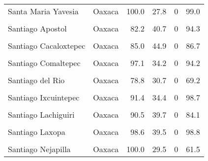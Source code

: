 \documentclass[
]{report}
\begin{document}
\begin{longtable}[t]{llrrrr}
Santa Maria Yavesia & Oaxaca & 100.0 & 27.8 & 0 & 99.0\\
\addlinespace
\cellcolor{gray!6}{Santiago Apoala} & \cellcolor{gray!6}{Oaxaca} & \cellcolor{gray!6}{90.8} & \cellcolor{gray!6}{27.6} & \cellcolor{gray!6}{0} & \cellcolor{gray!6}{94.3}\\
Santiago Apostol & Oaxaca & 82.2 & 40.7 & 0 & 94.3\\
\cellcolor{gray!6}{Santiago Atitlan} & \cellcolor{gray!6}{Oaxaca} & \cellcolor{gray!6}{82.4} & \cellcolor{gray!6}{38.1} & \cellcolor{gray!6}{0} & \cellcolor{gray!6}{98.9}\\
Santiago Cacaloxtepec & Oaxaca & 85.0 & 44.9 & 0 & 86.7\\
\cellcolor{gray!6}{Santiago Camotlan} & \cellcolor{gray!6}{Oaxaca} & \cellcolor{gray!6}{90.6} & \cellcolor{gray!6}{38.5} & \cellcolor{gray!6}{0} & \cellcolor{gray!6}{98.3}\\
\addlinespace
Santiago Comaltepec & Oaxaca & 97.1 & 34.2 & 0 & 94.2\\
\cellcolor{gray!6}{Santiago Choapam} & \cellcolor{gray!6}{Oaxaca} & \cellcolor{gray!6}{83.0} & \cellcolor{gray!6}{29.3} & \cellcolor{gray!6}{0} & \cellcolor{gray!6}{88.8}\\
Santiago del Rio & Oaxaca & 78.8 & 30.7 & 0 & 69.2\\
\cellcolor{gray!6}{Santiago Huauclilla} & \cellcolor{gray!6}{Oaxaca} & \cellcolor{gray!6}{95.8} & \cellcolor{gray!6}{28.5} & \cellcolor{gray!6}{0} & \cellcolor{gray!6}{81.0}\\
Santiago Ixcuintepec & Oaxaca & 91.4 & 34.4 & 0 & 98.7\\
\addlinespace
\cellcolor{gray!6}{Santiago Jocotepec} & \cellcolor{gray!6}{Oaxaca} & \cellcolor{gray!6}{83.9} & \cellcolor{gray!6}{30.6} & \cellcolor{gray!6}{0} & \cellcolor{gray!6}{95.2}\\
Santiago Lachiguiri & Oaxaca & 90.5 & 39.7 & 0 & 84.1\\
\cellcolor{gray!6}{Santiago Lalopa} & \cellcolor{gray!6}{Oaxaca} & \cellcolor{gray!6}{94.7} & \cellcolor{gray!6}{47.3} & \cellcolor{gray!6}{0} & \cellcolor{gray!6}{97.7}\\
Santiago Laxopa & Oaxaca & 98.6 & 39.5 & 0 & 98.8\\
\cellcolor{gray!6}{Santiago Miltepec} & \cellcolor{gray!6}{Oaxaca} & \cellcolor{gray!6}{97.1} & \cellcolor{gray!6}{47.5} & \cellcolor{gray!6}{0} & \cellcolor{gray!6}{67.0}\\
\addlinespace
Santiago Nejapilla & Oaxaca & 100.0 & 29.5 & 0 & 61.5\\

\end{longtable}
\end{document}
